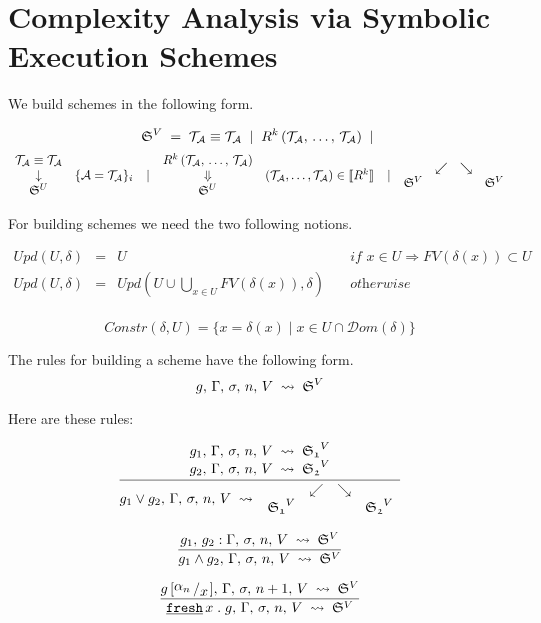 \section{Complexity Analysis via Symbolic Execution Schemes}
\label{sec:symbolic}

We build schemes in the following form.

\[  \mathfrak{S}^{V} \; = \;
\mathcal{T}_\mathcal{A} \equiv \mathcal{T}_\mathcal{A} \; \mid \;
R^k\,(\mathcal{T}_\mathcal{A}, \, \dots, \, \mathcal{T}_\mathcal{A}) \; \mid \; \]\[ 
\begin{array}{cl} \mathcal{T}_\mathcal{A} \equiv \mathcal{T}_\mathcal{A} \\ \downarrow & \{ \mathcal{A} = \mathcal{T}_\mathcal{A} \}_i \\ \mathfrak{S}^{U} \end{array} \; \mid \;
\begin{array}{cl} R^k\,(\mathcal{T}_\mathcal{A}, \, \dots, \, \mathcal{T}_\mathcal{A}) \\ \Downarrow &  (\mathcal{T}_\mathcal{A}, \dots, \mathcal{T}_\mathcal{A}) \in \llbracket R^k \rrbracket   \\ \mathfrak{S}^{U} \end{array} \; \mid \;
\begin{array}{cccc} & \swarrow & \searrow \\ \mathfrak{S}^{V} & & & \mathfrak{S}^{V} \end{array} \]

For building schemes we need the two following notions.

\[
\begin{array}{lcll}
Upd(U, \delta) & = & U & \quad \textit{if } x \in U \Rightarrow FV(\delta(x)) \subset U \\
Upd(U, \delta) & = & Upd(U \cup \bigcup\limits_{x \in U} FV(\delta(x)), \delta) & \quad \textit{otherwise} \\
\end{array}
\]

\[ Constr(\delta, U) = \{ x = \delta(x) \mid x \in U \cap \mathcal{D}om(\delta) \} \]

The rules for building a scheme have the following form. \[ g, \, \Gamma, \, \sigma, \, n, \, V \; \rightsquigarrow \; \mathfrak{S}^{V} \]

Here are these rules:

\[ \frac{\begin{array}{c}   g_1, \, \Gamma, \, \sigma, \, n, \, V \; \rightsquigarrow \; \mathfrak{S_1}^{V}   \\   g_2, \, \Gamma, \, \sigma, \, n, \, V \; \rightsquigarrow \; \mathfrak{S_2}^{V}   \end{array}}{  g_1 \lor g_2, \, \Gamma, \, \sigma, \, n, \, V \; \rightsquigarrow \;   \begin{array}{cccc} & \swarrow & \searrow \\ \mathfrak{S_1}^{V} & & & \mathfrak{S_2}^{V} \end{array}  } \]
		
\[ \frac{  g_1, \, g_2 : \Gamma, \, \sigma, \, n, \, V \; \rightsquigarrow \; \mathfrak{S}^{V}  }{  g_1 \land g_2, \, \Gamma, \, \sigma, \, n, \, V \; \rightsquigarrow \;  \mathfrak{S}^{V}  } \]
		
\[ \onepremrule
		{  \schemetrans{\substitute{g}{\alpha_n}{x}}{\Gamma}{\sigma}{n + 1}{V}{\schemewithvset{\mathfrak{S}}{V}}  }
		{  \schemetrans{\freshgoal{x}{g}}{\Gamma}{\sigma}{n}{V}{ \schemewithvset{\mathfrak{S}}{V} }  } \]

